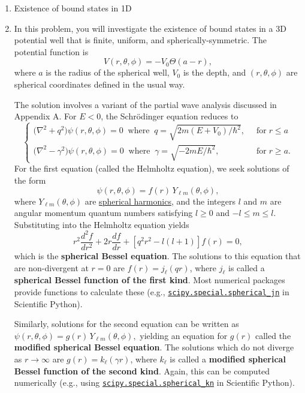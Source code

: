 \documentclass[pra,12pt]{revtex4}
\begin{document}
\begin{enumerate}
\item Existence of bound states in 1D
\label{ex:boundstate}

\item In this problem, you will investigate the existence of bound
  states in a 3D potential well that is finite, uniform, and
  spherically-symmetric.  The potential function is
$$V(r,\theta,\phi) = -V_0\Theta(a-r),$$
  where $a$ is the radius of the spherical well, $V_0$ is the depth,
  and $(r,\theta,\phi)$ are spherical coordinates defined in the usual
  way.

  The solution involves a variant of the partial wave analysis
  discussed in Appendix A.  For $E < 0$, the Schr\"odinger equation
  reduces to
$$\begin{cases}\Big(\nabla^2 + q^2\Big) \psi(r,\theta,\phi) = 0 \;\;\mathrm{where}\;\; q = \sqrt{2m(E+V_0)/\hbar^2}, \;\;&\mathrm{for} \; r \le a \\ \Big(\nabla^2 - \gamma^2\Big) \psi(r,\theta,\phi) = 0 \;\;\mathrm{where}\;\; \gamma = \sqrt{-2mE/\hbar^2}, \;\;&\mathrm{for} \; r \ge a. \end{cases}$$
  For the first equation (called the Helmholtz equation), we seek
  solutions of the form
  $$\psi(r,\theta,\phi) = f(r) \, Y_{\ell m}(\theta,\phi),$$
  where $Y_{\ell m}(\theta,\phi)$ are
  \href{https://en.wikipedia.org/wiki/Spherical_harmonics}{spherical
    harmonics}, and the integers $l$ and $m$ are angular momentum
  quantum numbers satisfying $l \ge 0$ and $-l \le m \le l$.
  Substituting into the Helmholtz equation yields
  $$r^2\frac{d^2f}{dr^2} + 2r \frac{df}{dr}+\left[q^2r^2-l(l+1)\right] f(r) = 0,$$
  which is the \textbf{spherical Bessel equation}.  The solutions to
  this equation that are non-divergent at $r = 0$ are $f(r) =
  j_\ell(qr)$, where $j_\ell$ is called a \textbf{spherical Bessel function
    of the first kind}.  Most numerical packages provide functions to
  calculate these (e.g.,
  \href{https://docs.scipy.org/doc/scipy/reference/generated/scipy.special.spherical_jn.html}{\texttt{scipy.special.spherical\_jn}}
  in Scientific Python).

  Similarly, solutions for the second equation can be written as
  $\psi(r,\theta,\phi) = g(r) \, Y_{\ell m}(\theta,\phi),$ yielding an
  equation for $g(r)$ called the \textbf{modified spherical Bessel
    equation}.  The solutions which do not diverge as $r\rightarrow
  \infty$ are $g(r) = k_\ell(\gamma r)$, where $k_\ell$ is called a
  \textbf{modified spherical Bessel function of the second kind}.
  Again, this can be computed numerically (e.g., using
  \href{https://docs.scipy.org/doc/scipy/reference/generated/scipy.special.spherical_kn.html#scipy.special.spherical_kn}{\texttt{scipy.special.spherical\_kn}}
  in Scientific Python).


\end{enumerate}
\end{document}
